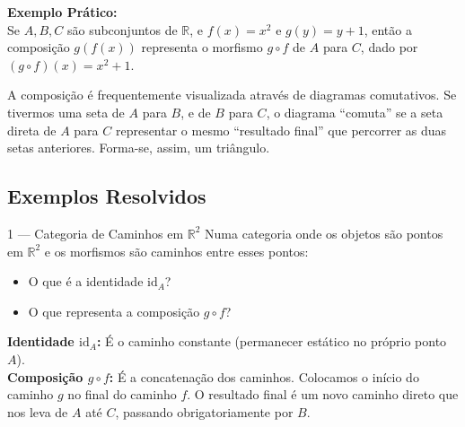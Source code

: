 \textbf{Exemplo Prático:} \\
Se $A, B, C$ são subconjuntos de $\mathbb{R}$, e $f(x) = x^2$ e $g(y) = y + 1$, então a composição $g(f(x))$ representa o morfismo $g \circ f$ de $A$ para $C$, dado por $(g \circ f)(x) = x^2 + 1$.

\begin{notebox}[title={Interpretação Visual (Diagramas Comutativos)}]
  A composição é frequentemente visualizada através de diagramas comutativos. Se tivermos uma seta de $A$ para $B$, e de $B$ para $C$, o diagrama ``comuta'' se a seta direta de $A$ para $C$ representar o mesmo ``resultado final'' que percorrer as duas setas anteriores. Forma-se, assim, um triângulo.
\end{notebox}


\subsection{Exemplos Resolvidos}

\begin{exbox}{1 --- Categoria de Caminhos em $\mathbb{R}^2$}
  Numa categoria onde os objetos são pontos em $\mathbb{R}^2$ e os morfismos são caminhos entre esses pontos:
  \begin{itemize}
      \item O que é a identidade $\text{id}_A$?
      \item O que representa a composição $g \circ f$?
  \end{itemize}
\end{exbox}
\begin{solbox}
  \textbf{Identidade $\text{id}_A$:} É o caminho constante (permanecer estático no próprio ponto $A$). \\
  \textbf{Composição $g \circ f$:} É a concatenação dos caminhos. Colocamos o início do caminho $g$ no final do caminho $f$. O resultado final é um novo caminho direto que nos leva de $A$ até $C$, passando obrigatoriamente por $B$.
\end{solbox}

